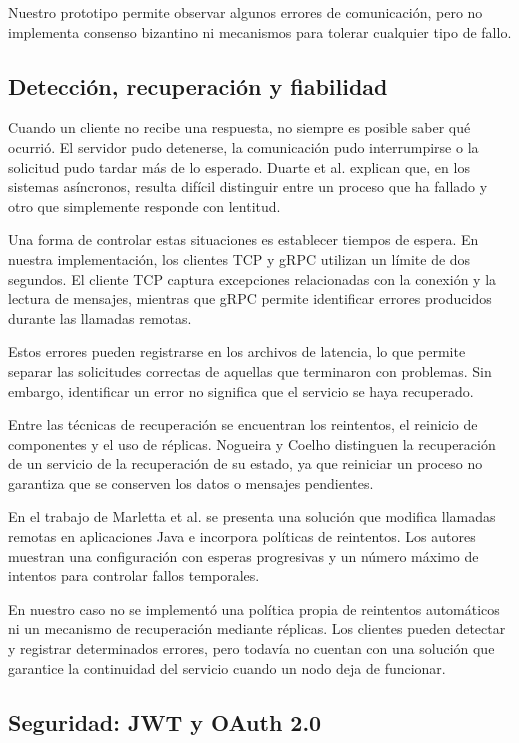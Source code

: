 Nuestro prototipo permite observar algunos
errores de comunicación, pero no implementa
consenso bizantino ni mecanismos para
tolerar cualquier tipo de fallo.

\subsection{Detección, recuperación y fiabilidad}

Cuando un cliente no recibe una respuesta,
no siempre es posible saber qué ocurrió.
El servidor pudo detenerse, la comunicación
pudo interrumpirse o la solicitud pudo
tardar más de lo esperado. Duarte et al.
\cite{duarte2023detectors} explican que,
en los sistemas asíncronos, resulta difícil
distinguir entre un proceso que ha fallado
y otro que simplemente responde con lentitud.

Una forma de controlar estas situaciones es
establecer tiempos de espera. En nuestra
implementación, los clientes TCP y gRPC
utilizan un límite de dos segundos.
El cliente TCP captura excepciones
relacionadas con la conexión y la lectura
de mensajes, mientras que gRPC permite
identificar errores producidos durante
las llamadas remotas.

Estos errores pueden registrarse en los
archivos de latencia, lo que permite
separar las solicitudes correctas de
aquellas que terminaron con problemas.
Sin embargo, identificar un error no
significa que el servicio se haya
recuperado.

Entre las técnicas de recuperación se
encuentran los reintentos, el reinicio
de componentes y el uso de réplicas.
Nogueira y Coelho \cite{nogueira2026fault}
distinguen la recuperación de un servicio
de la recuperación de su estado, ya que
reiniciar un proceso no garantiza que
se conserven los datos o mensajes
pendientes.

En el trabajo de Marletta et al.
\cite{marletta2024robustness} se presenta
una solución que modifica llamadas remotas
en aplicaciones Java e incorpora políticas
de reintentos. Los autores muestran una
configuración con esperas progresivas y
un número máximo de intentos para
controlar fallos temporales.

En nuestro caso no se implementó una
política propia de reintentos automáticos
ni un mecanismo de recuperación mediante
réplicas. Los clientes pueden detectar y
registrar determinados errores, pero
todavía no cuentan con una solución que
garantice la continuidad del servicio
cuando un nodo deja de funcionar.

\subsection{Seguridad: JWT y OAuth 2.0}

